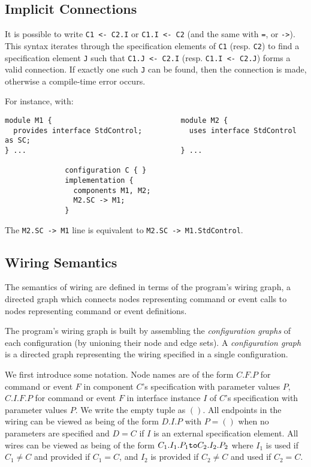 \documentclass[11pt]{article}
\newcommand{\kw}[1]{{\tt #1}}
\newcommand{\code}[1]{{\tt #1}}
\begin{document}
\subsection{Implicit Connections}
\label{sec:implicit}

It is possible to write \code{C1 <- C2.I} or \code{C1.I <- C2} (and the
same with \kw{=}, or \kw{->}). This syntax iterates through the
specification elements of \code{C1} (resp. \code{C2}) to find a
specification element \code{J} such that \code{C1.J <- C2.I}
(resp. \code{C1.I <- C2.J}) forms a valid connection. If exactly one such
\code{J} can be found, then the connection is made, otherwise a
compile-time error occurs.

For instance, with:
\begin{verbatim}
module M1 {                              module M2 {
  provides interface StdControl;           uses interface StdControl as SC;
} ...                                    } ...

              configuration C { }
              implementation {
                components M1, M2;
                M2.SC -> M1;
              }
\end{verbatim}
The \code{M2.SC -> M1} line is equivalent to \code{M2.SC -> M1.StdControl}.

\subsection{Wiring Semantics}
\label{sec:wiring}

The semantics of wiring are defined in terms of the program's wiring graph,
a directed graph which connects nodes representing command or event calls
to nodes representing command or event definitions.

The program's wiring graph is built by assembling the \emph{configuration
graphs} of each configuration (by unioning their node and edge sets).
A \emph{configuration graph} is a directed graph representing the wiring
specified in a single configuration.

We first introduce some notation. Node names are of the form $C.F.P$ for
command or event $F$ in component $C$'s specification with parameter values
$P$, $C.I.F.P$ for command or event $F$ in interface instance $I$ of $C$'s
specification with parameter values $P$. We write the empty tuple as $()$.
All endpoints in the wiring can be viewed as being of the form $D.I.P$ with
$P = ()$ when no parameters are specified and $D = C$ if $I$ is an external
specification element.  All wires can be viewed as being of the form
$C_1.I_1.P_1 \kw{to} C_2.I_2.P_2$ where $I_1$ is used if $C_1 \not= C$ and
provided if $C_1 = C$, and $I_2$ is provided if $C_2 \not= C$ and used if
$C_2 = C$.
\end{document}
